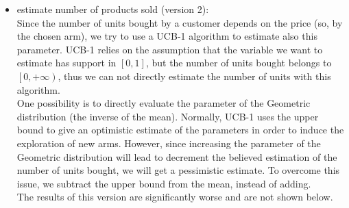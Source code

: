 \begin{itemize}
\begin{itemize}
    \end{itemize}
    \item estimate number of products sold (version 2):\\
    Since the number of units bought by a customer depends on the price (so, by the chosen arm), we try to use a UCB-1 algorithm to estimate also this parameter. UCB-1 relies on the assumption that the variable we want to estimate has support in $\left[0, 1 \right]$, but the number of units bought belongs to $\left[0, +\infty \right)$, thus we can not directly estimate the number of units with this algorithm.\\
    One possibility is to directly evaluate the parameter of the Geometric distribution (the inverse of the mean). Normally, UCB-1 uses the upper bound to give an optimistic estimate of the parameters in order to induce the exploration of new arms. However, since increasing the parameter of the Geometric distribution will lead to decrement the believed estimation of the number of units bought, we will get a pessimistic estimate. To overcome this issue, we subtract the upper bound from the mean, instead of adding.\\
 The results of this version are significantly worse and are not shown below.
\end{itemize}

